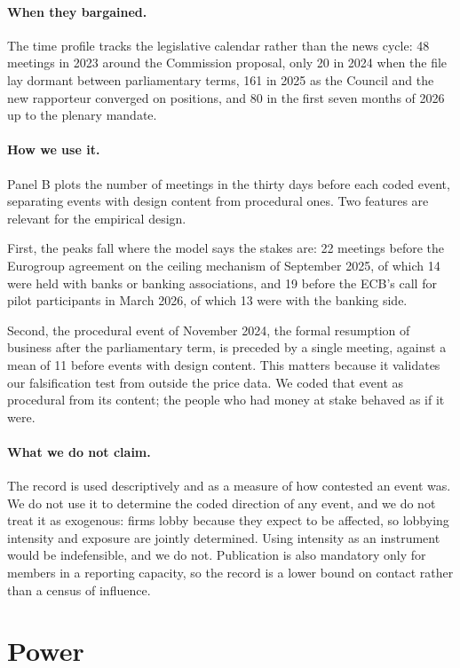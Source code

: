 \documentclass[11pt]{article}
\theoremstyle{plain}\newtheorem{proposition}{Proposition}
\begin{document}
\paragraph{When they bargained.} The time profile tracks the legislative calendar rather than the news cycle: 48 meetings in 2023 around the Commission proposal, only 20 in 2024 when the file lay dormant between parliamentary terms, 161 in 2025 as the Council and the new rapporteur converged on positions, and 80 in the first seven months of 2026 up to the plenary mandate.

\paragraph{How we use it.} Panel B plots the number of meetings in the thirty days before each coded event, separating events with design content from procedural ones. Two features are relevant for the empirical design.

First, the peaks fall where the model says the stakes are: 22 meetings before the Eurogroup agreement on the ceiling mechanism of September 2025, of which 14 were held with banks or banking associations, and 19 before the ECB's call for pilot participants in March 2026, of which 13 were with the banking side.

Second, the procedural event of November 2024, the formal resumption of business after the parliamentary term, is preceded by a single meeting, against a mean of 11 before events with design content. This matters because it validates our falsification test from outside the price data. We coded that event as procedural from its content; the people who had money at stake behaved as if it were.

\paragraph{What we do not claim.} The record is used descriptively and as a measure of how contested an event was. We do not use it to determine the coded direction of any event, and we do not treat it as exogenous: firms lobby because they expect to be affected, so lobbying intensity and exposure are jointly determined. Using intensity as an instrument would be indefensible, and we do not. Publication is also mandatory only for members in a reporting capacity, so the record is a lower bound on contact rather than a census of influence.

\section{Power}\label{sec:power}
\end{document}
